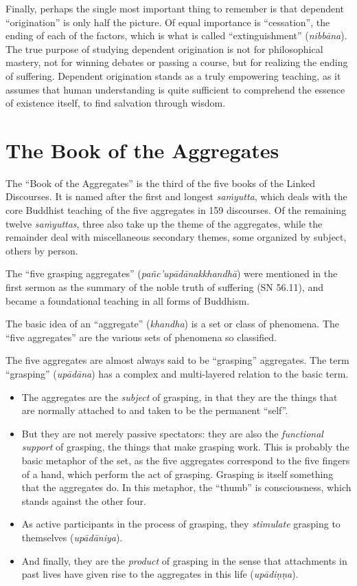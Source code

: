 \documentclass[12pt,openany]{book}%
\begin{document}
Finally, perhaps the single most important thing to remember is that dependent “origination” is only half the picture. Of equal importance is “cessation”, the ending of each of the factors, which is what is called “extinguishment” (\textit{\textsanskrit{nibbāna}}). The true purpose of studying dependent origination is not for philosophical mastery, not for winning debates or passing a course, but for realizing the ending of suffering. Dependent origination stands as a truly empowering teaching, as it assumes that human understanding is quite sufficient to comprehend the essence of existence itself, to find salvation through wisdom.

\section*{The Book of the Aggregates}

The “Book of the Aggregates” is the third of the five books of the Linked Discourses. It is named after the first and longest \textit{\textsanskrit{saṁyutta}}, which deals with the core Buddhist teaching of the five aggregates in 159 discourses. Of the remaining twelve \textit{\textsanskrit{saṁyuttas}}, three also take up the theme of the aggregates, while the remainder deal with miscellaneous secondary themes, some organized by subject, others by person.

The “five grasping aggregates” (\textit{\textsanskrit{pañc}’\textsanskrit{upādānakkhandhā}}) were mentioned in the first sermon as the summary of the noble truth of suffering (SN 56.11), and became a foundational teaching in all forms of Buddhism.

The basic idea of an “aggregate” (\textit{khandha}) is a set or class of phenomena. The “five aggregates” are the various sets of phenomena so classified.

The five aggregates are almost always said to be “grasping” aggregates. The term “grasping” (\textit{\textsanskrit{upādāna}}) has a complex and multi-layered relation to the basic term.

\begin{itemize}%
\item The aggregates are the \emph{subject} of grasping, in that they are the things that are normally attached to and taken to be the permanent “self”.%
\item But they are not merely passive spectators: they are also the \emph{functional support} of grasping, the things that make grasping work. This is probably the basic metaphor of the set, as the five aggregates correspond to the five fingers of a hand, which perform the act of grasping. Grasping is itself something that the aggregates do. In this metaphor, the “thumb” is consciousness, which stands against the other four.%
\item As active participants in the process of grasping, they \emph{stimulate} grasping to themselves (\textit{\textsanskrit{upādāniya}}).%
\item And finally, they are the \emph{product} of grasping in the sense that attachments in past lives have given rise to the aggregates in this life (\textit{\textsanskrit{upādiṇṇa}}).%
\end{itemize}
\end{document}
